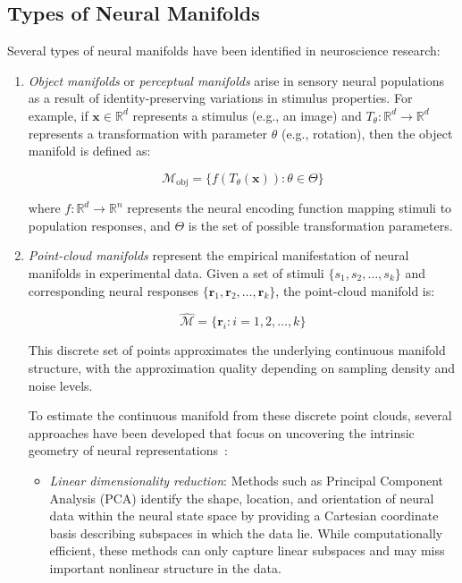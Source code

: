 \documentclass[11pt,a4paper]{article}
\begin{document}
\subsection{Types of Neural Manifolds}

Several types of neural manifolds have been identified in neuroscience research:

\begin{enumerate}
    \item \textit{Object manifolds} or \textit{perceptual manifolds} arise in sensory neural populations as a result of identity-preserving variations in stimulus properties. For example, if $\mathbf{x} \in \mathbb{R}^d$ represents a stimulus (e.g., an image) and $T_\theta: \mathbb{R}^d \rightarrow \mathbb{R}^d$ represents a transformation with parameter $\theta$ (e.g., rotation), then the object manifold is defined as:
    
    \begin{equation}
    \mathcal{M}_{\text{obj}} = \{f(T_\theta(\mathbf{x})) : \theta \in \Theta\}
    \end{equation}
    
    where $f: \mathbb{R}^d \rightarrow \mathbb{R}^n$ represents the neural encoding function mapping stimuli to population responses, and $\Theta$ is the set of possible transformation parameters.
    
    \item \textit{Point-cloud manifolds} represent the empirical manifestation of neural manifolds in experimental data. Given a set of stimuli $\{s_1, s_2, \ldots, s_k\}$ and corresponding neural responses $\{\mathbf{r}_1, \mathbf{r}_2, \ldots, \mathbf{r}_k\}$, the point-cloud manifold is:
    
    \begin{equation}
    \hat{\mathcal{M}} = \{\mathbf{r}_i : i = 1, 2, \ldots, k\}
    \end{equation}
    
    This discrete set of points approximates the underlying continuous manifold structure, with the approximation quality depending on sampling density and noise levels.
    
    To estimate the continuous manifold from these discrete point clouds, several approaches have been developed that focus on uncovering the intrinsic geometry of neural representations~\cite{chung2021neural}:
    
    \begin{itemize}
        \item \textit{Linear dimensionality reduction}: Methods such as Principal Component Analysis (PCA) identify the shape, location, and orientation of neural data within the neural state space by providing a Cartesian coordinate basis describing subspaces in which the data lie. While computationally efficient, these methods can only capture linear subspaces and may miss important nonlinear structure in the data.
        

\end{itemize}
\end{enumerate}
\end{document}

